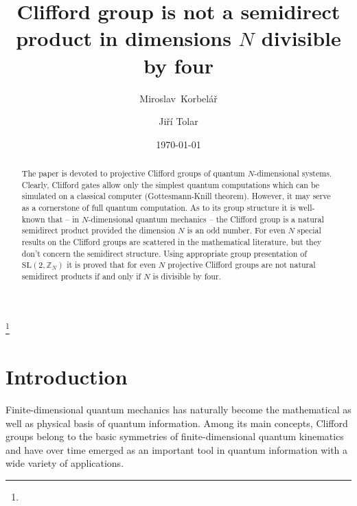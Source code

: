 \documentclass[10pt]{amsart}
\theoremstyle{plain}
\theoremstyle{definition}
\theoremstyle{remark}%
\newcommand{\Z}{\mathbb{Z}}
\newcommand{\SL}{\mathrm{SL}}
\begin{document}
\title[Clifford group is not a semidir. product if  $N$ is divisible by four]{Clifford group is not a semidirect product in dimensions $N$
divisible by four}

\author[M.~Korbel\'a\v{r}]{Miroslav~Korbel\'a\v{r}}
\address{Department of Mathematics, Faculty of Electrical Engineering, 
Czech Technical University in Prague, Jugosl\'avsk\'ych partiz\'an\r{u} 1, 
166 27 Prague 6, Czech Republic}

\author[J.~Tolar]{Ji\v{r}\'i Tolar}
\address{Department of Physics,
 Faculty of Nuclear Sciences and  Physical  Engineering,
 Czech Technical University in Prague, B\v{r}ehov\'{a} 7,
 115 19 Prague 1, Czech Republic}


\thanks{}

\subjclass[2010]{}
\date{\today}


\begin{abstract}
The paper is devoted to projective Clifford groups of quantum $N$-dimensional systems. 
Clearly, Clifford gates allow only the simplest quantum computations
which can be simulated on a classical computer (Gottesmann-Knill theorem).
However, it may serve as a cornerstone of full quantum computation.
As to its group structure it is well-known that -- in $N$-dimensional 
quantum mechanics -- the Clifford group is a natural semidirect product
provided the dimension $N$ is an odd number.
For even $N$  special results on the Clifford groups are scattered 
in the mathematical literature, but they don't concern the semidirect structure.
Using appropriate group presentation of $\SL(2,\Z_N)$ 
it is proved that for even $N$ projective Clifford groups are not 
natural semidirect products if and only if $N$ is divisible by four.
\end{abstract}
\maketitle



\section{Introduction}


Finite-dimensional quantum mechanics has naturally become 
the mathematical as well as physical basis of quantum information. 
Among its main concepts, Clifford groups belong to the basic 
symmetries of finite-dimensional quantum kinematics and 
have over time emerged as an important tool in
quantum information with a wide variety of applications.
\end{document}
